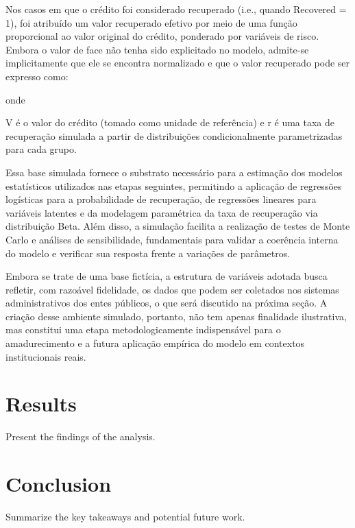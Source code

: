 \documentclass[a4paper,12pt]{article}
\begin{document}
Nos casos em que o crédito foi considerado recuperado (i.e., quando Recovered = 1), foi atribuído um valor recuperado efetivo por meio de uma função proporcional ao valor original do crédito, ponderado por variáveis de risco. Embora o valor de face não tenha sido explicitado no modelo, admite-se implicitamente que ele se encontra normalizado e que o valor recuperado pode ser expresso como:

onde 

V é o valor do crédito (tomado como unidade de referência) e r é uma taxa de recuperação simulada a partir de distribuições condicionalmente parametrizadas para cada grupo.

Essa base simulada fornece o substrato necessário para a estimação dos modelos estatísticos utilizados nas etapas seguintes, permitindo a aplicação de regressões logísticas para a probabilidade de recuperação, de regressões lineares para variáveis latentes e da modelagem paramétrica da taxa de recuperação via distribuição Beta. Além disso, a simulação facilita a realização de testes de Monte Carlo e análises de sensibilidade, fundamentais para validar a coerência interna do modelo e verificar sua resposta frente a variações de parâmetros.

Embora se trate de uma base fictícia, a estrutura de variáveis adotada busca refletir, com razoável fidelidade, os dados que podem ser coletados nos sistemas administrativos dos entes públicos, o que será discutido na próxima seção. A criação desse ambiente simulado, portanto, não tem apenas finalidade ilustrativa, mas constitui uma etapa metodologicamente indispensável para o amadurecimento e a futura aplicação empírica do modelo em contextos institucionais reais.

\section{Results}
Present the findings of the analysis.

\section{Conclusion}
Summarize the key takeaways and potential future work.

\newpage


\end{document}
